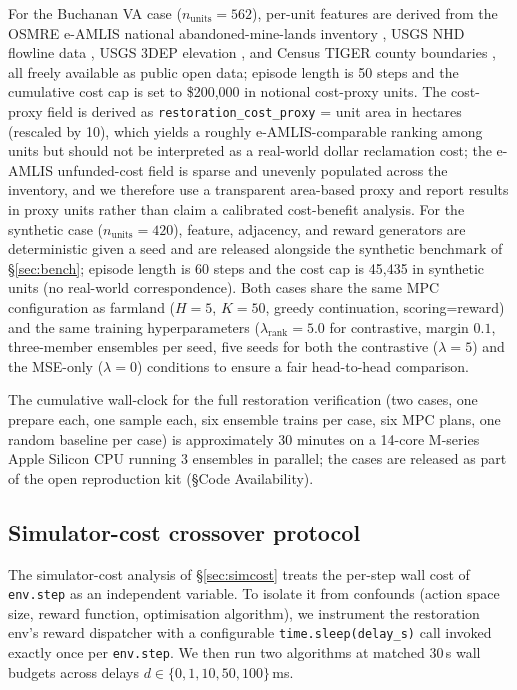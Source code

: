 \documentclass[11pt]{article}
\begin{document}
For the Buchanan VA case ($n_{\text{units}}=562$), per-unit features are derived from the OSMRE e-AMLIS national abandoned-mine-lands inventory \citep{osmre2019eamlis}, USGS NHD flowline data \citep{usgs2024nhd}, USGS 3DEP elevation \citep{usgs2024_3dep}, and Census TIGER county boundaries \citep{census2023tiger}, all freely available as public open data; episode length is 50 steps and the cumulative cost cap is set to \$200{,}000 in notional cost-proxy units. The cost-proxy field is derived as \texttt{restoration\_cost\_proxy} = unit area in hectares (rescaled by 10), which yields a roughly e-AMLIS-comparable ranking among units but should not be interpreted as a real-world dollar reclamation cost; the e-AMLIS unfunded-cost field is sparse and unevenly populated across the inventory, and we therefore use a transparent area-based proxy and report results in proxy units rather than claim a calibrated cost-benefit analysis. For the synthetic case ($n_{\text{units}}=420$), feature, adjacency, and reward generators are deterministic given a seed and are released alongside the synthetic benchmark of \S\ref{sec:bench}; episode length is 60 steps and the cost cap is 45{,}435 in synthetic units (no real-world correspondence). Both cases share the same MPC configuration as farmland ($H{=}5$, $K{=}50$, greedy continuation, scoring=reward) and the same training hyperparameters ($\lambda_{\text{rank}}{=}5.0$ for contrastive, margin $0.1$, three-member ensembles per seed, five seeds for both the contrastive ($\lambda{=}5$) and the MSE-only ($\lambda{=}0$) conditions to ensure a fair head-to-head comparison.

The cumulative wall-clock for the full restoration verification (two cases, one prepare each, one sample each, six ensemble trains per case, six MPC plans, one random baseline per case) is approximately 30 minutes on a 14-core M-series Apple Silicon CPU running 3 ensembles in parallel; the cases are released as part of the open reproduction kit (\S Code Availability).

\subsection{Simulator-cost crossover protocol}\label{sec:methods-simcost}

The simulator-cost analysis of \S\ref{sec:simcost} treats the per-step wall cost of \texttt{env.step} as an independent variable. To isolate it from confounds (action space size, reward function, optimisation algorithm), we instrument the restoration env's reward dispatcher with a configurable \texttt{time.sleep(delay\_s)} call invoked exactly once per \texttt{env.step}. We then run two algorithms at matched 30\,s wall budgets across delays $d \in \{0, 1, 10, 50, 100\}$\,ms.
\end{document}
